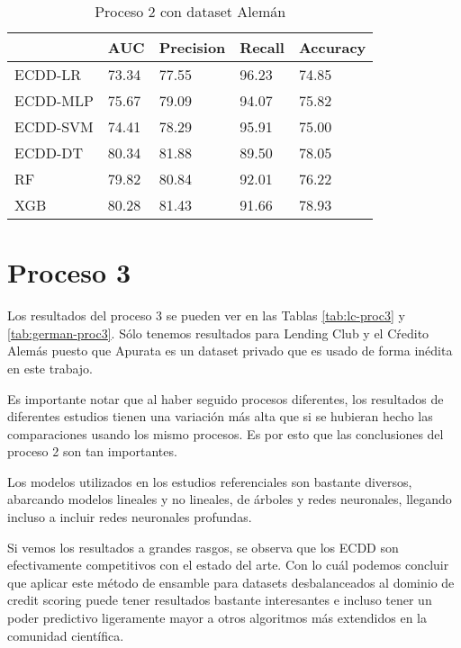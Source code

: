 \begin{table}[]
\centering
\caption{Proceso 2 con dataset Alemán}
\label{tab:german-proc2}
\begin{tabularx}{0.75\textwidth}{|l|Y Y Y Y|}
                \hline
                & AUC       & Precision & Recall    & Accuracy  \\
                \hline
ECDD-LR           & 73.34     & 77.55     & 96.23     & 74.85     \\
ECDD-MLP          & 75.67     & 79.09     & 94.07     & 75.82     \\
ECDD-SVM          & 74.41     & 78.29     & 95.91     & 75.00     \\
ECDD-DT           & 80.34     & 81.88     & 89.50     & 78.05     \\
                \hline
RF              & 79.82     & 80.84     & 92.01     & 76.22     \\
XGB             & 80.28     & 81.43     & 91.66     & 78.93     \\
                \hline
\end{tabularx}
\end{table}


\section{Proceso 3} %

Los resultados del proceso 3 se pueden ver en las Tablas \ref{tab:lc-proc3} y \ref{tab:german-proc3}. Sólo tenemos resultados para Lending Club y el Cŕedito Alemás puesto que Apurata es un dataset privado que es usado de forma inédita en este trabajo.

Es importante notar que al haber seguido procesos diferentes, los resultados de diferentes estudios tienen una variación más alta que si se hubieran hecho las comparaciones usando los mismo procesos. Es por esto que las conclusiones del proceso 2 son tan importantes.

Los modelos utilizados en los estudios referenciales son bastante diversos, abarcando modelos lineales y no lineales, de árboles y redes neuronales, llegando incluso a incluir redes neuronales profundas.

Si vemos los resultados a grandes rasgos, se observa que los \ac{ECDD} son efectivamente competitivos con el estado del arte. Con lo cuál podemos concluir que aplicar este método de ensamble para datasets desbalanceados al dominio de credit scoring puede tener resultados bastante interesantes e incluso tener un poder predictivo ligeramente mayor a otros algoritmos más extendidos en la comunidad científica. 


